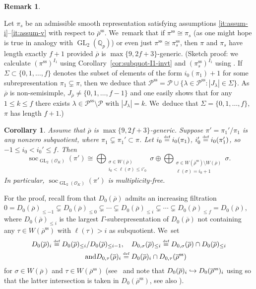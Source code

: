 \documentclass[JEP,XML,SOM,Unicode,NoFloatCountersInSection, NoEqCountersInSection,published]{cedram}
\newcommand\hto{\mathrel{\lhook\joinrel\to}}
\newcommand{\defeq}{\stackrel{\textrm{\tiny{\upshape{def}}}}{=}}
\newcommand{\cO}{\mathcal{O}}
\renewcommand{\P}{\mathscr P}
\renewcommand{\ss}{\mathrm{ss}}
\newcommand{\Qp}{\mathbb{Q}_{p}}
\newcommand{\rhobar}{\overline{\rho}}
\newcommand{\brho}{\overline{\rho}}
\DeclareMathOperator{\GL}{GL}
\DeclareMathOperator{\soc}{soc}
\theoremstyle{plain}
\newtheorem{cor}[prop]{Corollary}
\theoremstyle{definition}
\newtheorem{rem}[prop]{Remark}
\begin{document}
\begin{rem}\label{rem:length-f+1}

Let $\pi_s$ be an admissible smooth representation satisfying assumptions \eqref{it:assum-i}--\eqref{it:assum-v} with respect to $\rhobar^{\ss}$. We~remark that if $\pi^\ss \cong \pi_s$ (as one might hope is true in analogy with $\GL_2(\Qp)$) or even just $\pi^\ss \cong \pi_s^\ss$, then $\pi$ and $\pi_s$ have length exactly $f+1$ provided $\rhobar$ is $\max\{9,2f+3\}$-generic.
(Sketch proof: we calculate $(\pi^\ss)^{I_1}$ using Corollary~\ref{cor:subquot-I1-invt} and $(\pi_s^\ss)^{I_1}$ using \cite[Cor.\,3.2.5]{BHHMS4}.
If $\Sigma \subset \{0,1,\dots,f\}$ denotes the subset of elements of the form $i_0(\pi_1)+1$ for some subrepresentation $\pi_1 \subsetneq \pi$, then we deduce that $\P^\ss = \P \cup \{ \lambda \in \P^\ss: |J_\lambda| \in \Sigma \}$. As~$\brho$ is non-semisimple, $J_{\brho} \ne \{0,1,\dots,f-1\}$ and one easily shows that for any $1 \le k \le f$ there exists $\lambda \in \P^\ss \setminus \P$ with $|J_\lambda| = k$. We~deduce that $\Sigma = \{0,1,\dots,f\}$, \ie $\pi$ has length $f+1$.)
\end{rem}

\begin{cor}\label{cor:subquot-K-soc}
{Assume that $\brho$ is $\max\{9,2f+3\}$-generic.}
Suppose $\pi' = \pi_1'/\pi_1$ is any nonzero subquotient, where $\pi_1 \subsetneq \pi_1' \subset \pi$.
Let $i_0 \defeq i_0(\pi_1)$, $i_0' \defeq i_0(\pi_1')$, so~$-1 \le i_0 < i_0' \le f$.
Then
\begin{equation}\label{eq:subquot-K-soc}
\soc_{\GL_2(\cO_K)}(\pi') \cong \bigoplus_{\substack{\sigma \in W(\brho)\\i_0 < \ell(\sigma) \le i'_0}} \sigma \oplus \bigoplus_{\substack{\sigma \in W(\brho^\ss) \setminus W(\brho)\\ \ell(\sigma) = i_0+1}} \sigma.
\end{equation}
In particular, $\soc_{\GL_2(\cO_K)}(\pi')$ is multiplicity-free.
\end{cor}

For the proof, recall from \cite[\S 4.3.4
]{BHHMS4} that $D_0(\brho)$ admits an increasing filtration $0=D_0(\brho)_{\leq -1}\subsetneq D_0(\brho)_{\leq 0}\subsetneq \cdots \subsetneq D_0(\brho)_{\leq i}\subsetneq \cdots \subsetneq D_0(\brho)_{\leq f}=D_0(\brho),$
where $D_0(\brho)_{\leq i}$ is the largest $\Gamma$-subrepresentation of $D_0(\brho)$ not containing any $\tau\in W(\brho^\ss)$ with $\ell(\tau)>i$ as subquotient. We~set
\begin{gather*}
D_{0}(\brho)_i\defeq D_0(\brho)_{\leq i}/D_0(\brho)_{\leq i-1},\quad D_{0,\sigma}(\brho)_{\leq i}\defeq D_{0,\sigma}(\brho)\cap D_{0}(\brho)_{\leq i}\\
\tag*{and} D_{0,\tau}(\brho)_{i} \defeq D_0(\brho)_i \cap D_{0,\tau}(\brho^\ss)
\end{gather*}
for $\sigma\in W(\brho)$ and $\tau\in W(\brho^\ss)$ (see \loccit~and note that $D_0(\brho)_i\hto D_0(\brho^\ss)_i$ using \cite[Prop.\,13.1]{BP} so that the latter intersection is taken in $D_0(\brho^\ss)$, see also \cite[Prop.\,5.2]{Hu-SMF}).
\end{document}
